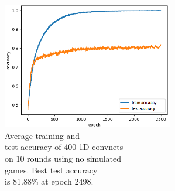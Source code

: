 \begin{minipage}{0.5\textwidth}
	\begin{figure}[H]
		\centering
		\includegraphics[width=7.5cm]{images/bestHistories/edit/1d_20s_sd0x_acc_new.png}
		\caption[Average training and test accuracy of 400 1D convnets on 10 rounds using no simulated games.]{Average training and \\\hspace{0\textwidth}test accuracy of 400 1D convnets \\\hspace{0\textwidth}on 10 rounds using no simulated \\\hspace{0\textwidth}games. Best test accuracy\\\hspace{0\textwidth} is 81.88\% at epoch 2498.}
		\label{fig:1d20}
	\end{figure}
\end{minipage}

